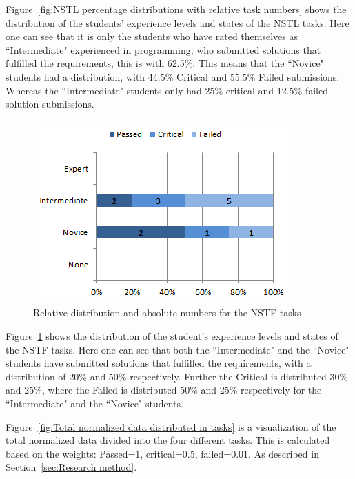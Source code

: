 \documentclass{sig-alternate-05-2015}
\begin{document}
Figure~\ref{fig:NSTL percentage distributions with relative task numbers} shows the distribution of the students' experience levels and states of the NSTL tasks. Here one can see that it is only the students who have rated themselves as ``Inter\-mediate" experienced in programming, who submitted solutions that fulfilled the requirements, this is with 62.5\%. This means that the ``Novice" students had a distribution, with 44.5\% Critical and 55.5\% Failed submissions. Whereas the ``Inter\-mediate" students only had 25\% critical and 12.5\% failed solution submissions.

\begin{figure}[!ht]
	\centering
	\includegraphics[width=1\linewidth]{img09}
	\caption{Relative distribution and absolute numbers for the NSTF tasks}
	\label{fig:NSTF percentage distributions with relative task numbers}
\end{figure}

Figure~\ref{fig:NSTF percentage distributions with relative task numbers} shows the distribution of the student's experience levels and states of the NSTF tasks. Here one can see that both the ``Intermediate" and the ``Novice" students have submitted solutions that fulfilled the requirements, with a distribution of 20\% and 50\% respectively. Further the Critical is distributed 30\% and 25\%, where the Failed is distributed 50\% and 25\% respectively for the ``Intermediate" and the ``Novice" students.

Figure~\ref{fig:Total normalized data distributed in tasks} is a visualization of the total normalized data divided into the four different tasks. This is calculated based on the weights: Passed=1, critical=0.5, failed=0.01. As described in Section~\ref{sec:Research method}.
\end{document}
